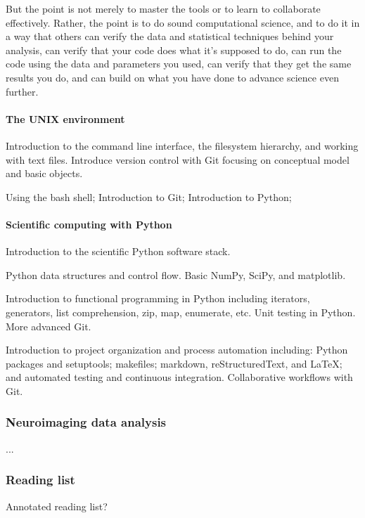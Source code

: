 But the point is not merely to master the tools or to learn to collaborate
effectively.  Rather, the point is to do sound computational science, and to do
it in a way that others can verify the data and statistical techniques behind
your analysis, can verify that your code does what it’s supposed to do, can run
the code using the data and parameters you used, can verify that they get the
same results you do, and can build on what you have done to advance science
even further.

\paragraph*{The UNIX environment}
Introduction to the command line
interface, the filesystem hierarchy, and working with text files. Introduce
version control with Git focusing on conceptual model and basic objects.

Using the bash shell;
Introduction to Git;
Introduction to Python;

\paragraph*{Scientific computing with Python}

Introduction to the scientific Python software stack.

Python data structures and control flow.  Basic NumPy, SciPy, and matplotlib.

Introduction to functional programming in Python including iterators, generators,
list comprehension, zip, map, enumerate, etc.  Unit testing in Python.  More advanced
Git.

Introduction to project organization and process automation including: Python
packages and setuptools; makefiles; markdown, reStructuredText, and LaTeX; and
automated testing and continuous integration. Collaborative workflows with Git.



\subsubsection{Neuroimaging data analysis}


...

\subsubsection{Reading list}

Annotated reading list?

